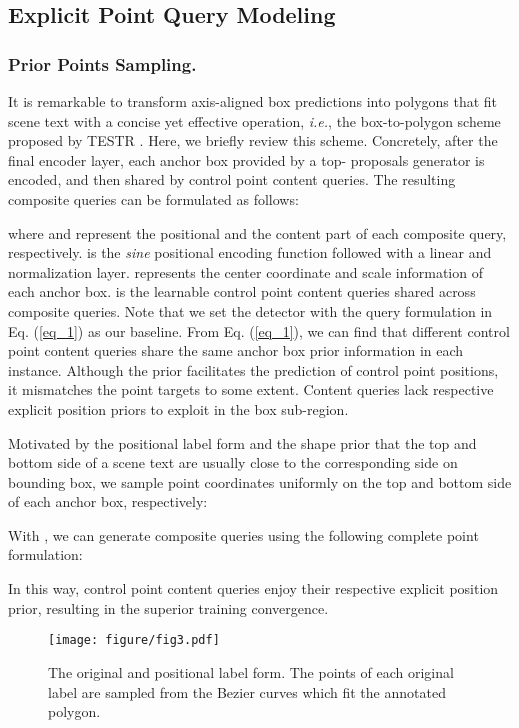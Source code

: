 \documentclass[letterpaper]{article} \usepackage{aaai23}  \usepackage{times}  \usepackage{helvet}  \usepackage{courier}  \usepackage[hyphens]{url}  \usepackage{graphicx} \urlstyle{rm}
\begin{document}
\subsection{Explicit Point Query Modeling}
\subsubsection{Prior Points Sampling.} It is remarkable to transform axis-aligned box predictions into polygons that fit scene text with a concise yet effective operation, \emph{i.e.}, the box-to-polygon scheme proposed by TESTR \cite{zhang2022text}. Here, we briefly review this scheme. Concretely, after the final encoder layer, each anchor box provided by a top- proposals generator is encoded, and then shared by  control point content queries. The resulting composite queries  can be formulated as follows:

where  and  represent the positional and the content part of each composite query, respectively.  is the \textit{sine} positional encoding function followed with a linear and normalization layer.  represents the center coordinate and scale information of each anchor box.  is the  learnable control point content queries shared across  composite queries. Note that we set the detector with the query formulation in Eq. (\ref{eq_1}) as our baseline. From Eq. (\ref{eq_1}), we can find that different control point content queries share the same anchor box prior information in each instance. Although the prior facilitates the prediction of control point positions, it mismatches the point targets to some extent. Content queries lack respective explicit position priors to exploit in the box sub-region. 

Motivated by the positional label form and the shape prior that the top and bottom side of a scene text are usually close to the corresponding side on bounding box, we sample  point coordinates  uniformly on the top and bottom side of each anchor box, respectively:

\label{eq_2}
With , we can generate composite queries using the following complete point formulation: 


In this way,  control point content queries enjoy their respective explicit position prior, resulting in the superior training convergence.

\begin{figure}[t!]
    \centering
    \texttt{[image: figure/fig3.pdf]}
    \caption{The original and positional label form. The points of each original label are sampled from the Bezier curves \cite{liu2020abcnet} which fit the annotated polygon.}
    \label{fig:ori_pos_label}
\end{figure}
\end{document}
